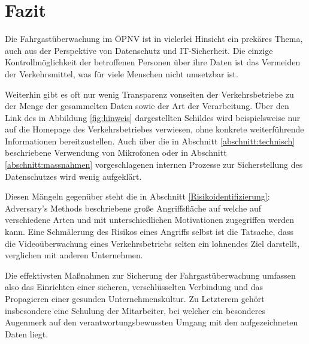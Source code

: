 \section{Fazit}
Die Fahrgastüberwachung im ÖPNV ist in vielerlei Hinsicht ein prekäres Thema, auch aus der Perspektive von Datenschutz und IT-Sicherheit.
Die einzige Kontrollmöglichkeit der betroffenen Personen über ihre Daten ist das Vermeiden der Verkehrsmittel, was für viele Menschen nicht umsetzbar ist.

Weiterhin gibt es oft nur wenig Transparenz vonseiten der Verkehrsbetriebe zu der Menge der gesammelten Daten sowie der Art der Verarbeitung. Über den Link des in Abbildung \ref{fig:hinweis}
dargestellten Schildes wird beispielsweise nur auf die Homepage des Verkehrsbetriebes verwiesen, ohne konkrete weiterführende Informationen bereitzustellen. Auch über die in Abschnitt \ref{abschnitt:technisch} beschriebene
Verwendung von Mikrofonen oder in Abschnitt \ref{abschnitt:massnahmen} vorgeschlagenen internen Prozesse zur Sicherstellung des Datenschutzes wird wenig aufgeklärt.

Diesen Mängeln gegenüber steht die in \glqq{}Abschnitt \ref{Risikoidentifizierung}: Adversary's Methods\grqq{} beschriebene große Angriffsfläche auf welche auf verschiedene Arten und mit unterschiedlichen Motivationen zugegriffen werden kann.
Eine Schmälerung des Risikos eines Angriffs selbst ist die Tatsache, dass die Videoüberwachung eines Verkehrsbetriebs selten ein lohnendes Ziel darstellt, verglichen mit anderen Unternehmen.


Die effektivsten Maßnahmen zur Sicherung der Fahrgastüberwachung umfassen also das Einrichten einer sicheren, verschlüsselten Verbindung und das Propagieren
einer gesunden Unternehmenskultur. Zu Letzterem gehört insbesondere eine Schulung der Mitarbeiter, bei welcher ein besonderes Augenmerk auf den verantwortungsbewussten Umgang
mit den aufgezeichneten Daten liegt.
